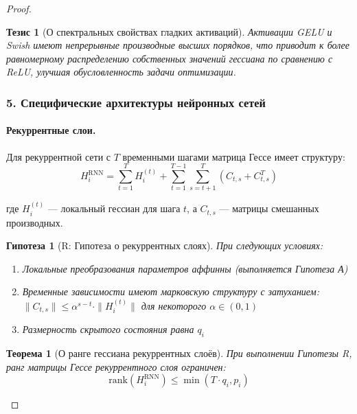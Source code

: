 \documentclass[a4paper,12pt]{article}
\newtheorem{theorem}{Теорема}
\newtheorem{hypothesis}{Гипотеза}
\newtheorem{proposition}{Тезис}
\begin{document}
\begin{proof}
    \begin{proposition}[О спектральных свойствах гладких активаций]
    Активации GELU и Swish имеют непрерывные производные высших порядков, что приводит к более равномерному распределению собственных значений гессиана по сравнению с ReLU, улучшая обусловленность задачи оптимизации.
    \end{proposition}
    
    \subsubsection*{5. Специфические архитектуры нейронных сетей}
    
    \paragraph{Рекуррентные слои.}
    Для рекуррентной сети с $T$ временными шагами матрица Гессе имеет структуру:
    \begin{equation}
    H_i^{\text{RNN}} = \sum_{t=1}^T H_i^{(t)} + \sum_{t=1}^{T-1} \sum_{s=t+1}^T (C_{t,s} + C_{t,s}^T)
    \end{equation}
    
    где $H_i^{(t)}$ — локальный гессиан для шага $t$, а $C_{t,s}$ — матрицы смешанных производных.
    
    \begin{hypothesis}[R: Гипотеза о рекуррентных слоях]
    При следующих условиях:
    \begin{enumerate}
    \item[(R.1)] Локальные преобразования параметров аффинны (выполняется Гипотеза А)
    \item[(R.2)] Временные зависимости имеют марковскую структуру с затуханием: $\|C_{t,s}\| \leq \alpha^{s-t} \cdot \|H_i^{(t)}\|$ для некоторого $\alpha \in (0,1)$
    \item[(R.3)] Размерность скрытого состояния равна $q_i$
    \end{enumerate}
    \end{hypothesis}
    
    \begin{theorem}[О ранге гессиана рекуррентных слоёв]
    При выполнении Гипотезы R, ранг матрицы Гессе рекуррентного слоя ограничен:
    \begin{equation}
    \text{rank}(H_i^{\text{RNN}}) \leq \min(T \cdot q_i, p_i)
    \end{equation}
    \end{theorem}
    

\end{proof}
\end{document}
